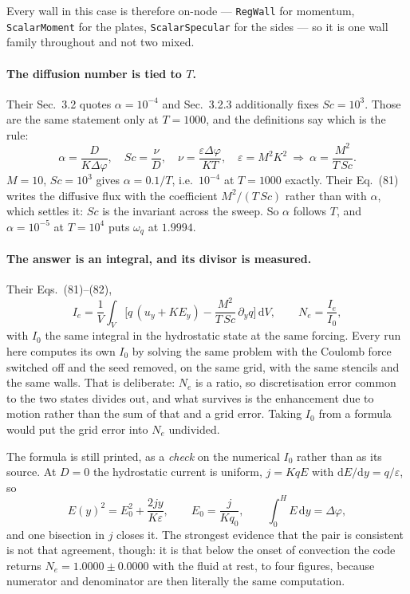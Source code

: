 \documentclass[11pt,a4paper]{article}
\newcommand{\code}[1]{\texttt{\small #1}}
\begin{document}
Every wall in this case is therefore on-node --- \code{RegWall} for momentum,
\code{ScalarMoment} for the plates, \code{ScalarSpecular} for the sides --- so it
is one wall family throughout and not two mixed.

\paragraph{The diffusion number is tied to $T$.} Their Sec.~3.2 quotes
$\alpha=10^{-4}$ and Sec.~3.2.3 additionally fixes $\mathit{Sc}=10^{3}$. Those
are the same statement only at $T=1000$, and the definitions say which is the
rule:
\begin{equation}
  \alpha=\frac{D}{K\Delta\varphi},\quad
  \mathit{Sc}=\frac{\nu}{D},\quad
  \nu=\frac{\varepsilon\Delta\varphi}{KT},\quad
  \varepsilon=M^2K^2
  \ \Longrightarrow\
  \alpha=\frac{M^2}{T\,\mathit{Sc}} .
  \label{eq:alphasc}
\end{equation}
$M=10$, $\mathit{Sc}=10^3$ gives $\alpha=0.1/T$, i.e.\ $10^{-4}$ at $T=1000$
exactly. Their Eq.~(81) writes the diffusive flux with the coefficient
$M^2/(T\,\mathit{Sc})$ rather than with $\alpha$, which settles it: $\mathit{Sc}$
is the invariant across the sweep. So $\alpha$ follows $T$, and $\alpha=10^{-5}$
at $T=10^4$ puts $\omega_q$ at $1.9994$.

\paragraph{The answer is an integral, and its divisor is measured.} Their
Eqs.~(81)--(82),
\begin{equation}
  I_e=\frac{1}{V}\int_V\!\Big[q\,(u_y+KE_y)-\frac{M^2}{T\,\mathit{Sc}}\,
  \partial_y q\Big]\,\mathrm{d}V,
  \qquad N_e=\frac{I_e}{I_0},
  \label{eq:ne}
\end{equation}
with $I_0$ the same integral in the hydrostatic state at the same forcing. Every
run here computes its own $I_0$ by solving the same problem with the Coulomb
force switched off and the seed removed, on the same grid, with the same stencils
and the same walls. That is deliberate: $N_e$ is a ratio, so discretisation error
common to the two states divides out, and what survives is the enhancement due to
motion rather than the sum of that and a grid error. Taking $I_0$ from a formula
would put the grid error into $N_e$ undivided.

The formula is still printed, as a \emph{check} on the numerical $I_0$ rather
than as its source. At $D=0$ the hydrostatic current is uniform, $j=KqE$ with
$\mathrm{d}E/\mathrm{d}y=q/\varepsilon$, so
\begin{equation}
  E(y)^2=E_0^2+\frac{2jy}{K\varepsilon},\qquad E_0=\frac{j}{Kq_0},\qquad
  \int_0^H\!E\,\mathrm{d}y=\Delta\varphi,
  \label{eq:j0}
\end{equation}
and one bisection in $j$ closes it. The strongest evidence that the pair is
consistent is not that agreement, though: it is that below the onset of
convection the code returns $N_e=1.0000\pm0.0000$ with the fluid at rest, to
four figures, because numerator and denominator are then literally the same
computation.
\end{document}

